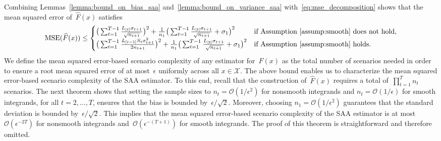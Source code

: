 \documentclass[11pt]{article}
\let\hat\widehat
\begin{document}
Combining Lemmas~\ref{lemma:bound_on_bias_saa} and~\ref{lemma:bound_on_variance_saa} with~\eqref{eq:mse_decomposition} shows that the mean squared error of~$\hat F(x)$ satisfies
\begin{align*}
\text{MSE}(\hat{F}(x)) \leq 
\begin{cases}
      \big( \sum_{t=1}^{T-1} \frac{L_{[t]}\sigma_{t+1}}{\sqrt{n_{t+1}}} \big)^2 + \frac{1}{n_1}\big(\sum_{t=1}^{T-1} \frac{L_{[t]} \sigma_{t+1}}{\sqrt{n_{t+1}}} + \sigma_1\big)^2  &\text{if Assumption~\ref{assump:smooth} does not hold},\\ 
          \big( \sum_{t=1}^{T-1} \frac{L_{[t-1]}S_t \sigma_{t+1}^2}{2n_{t+1}}  \big)^2 + \frac{1}{n_1}\big(\sum_{t=1}^{T-1} \frac{L_{[t]} \sigma_{t+1}}{\sqrt{n_{t+1}}} + \sigma_1\big)^2  &\text{if Assumption~\ref{assump:smooth} holds}.
\end{cases} 
\end{align*}
We define the mean squared error-based scenario complexity of any estimator for~$F(x)$ as the total number of scenarios needed in order to ensure a root mean squared error of at most~$\epsilon$ uniformly across all $x\in \mathcal{X}$. The above bound enables us to characterize the mean squared error-based scenario complexity of the SAA estimator. To this end, recall that the construction of~$\hat F(x)$ requires a total of~$\prod_{t=1}^{T}n_t$ scenarios. The next theorem shows that setting the sample sizes to $n_t = \mathcal{O}(1/\epsilon^2)$ for nonsmooth integrands and $n_t = \mathcal{O}(1/\epsilon)$ for smooth integrands, for all $t = 2, \ldots, T$, ensures that the bias is bounded by~$\epsilon/\sqrt{2}$. Moreover, choosing $n_1 = \mathcal{O}(1/\epsilon^2)$ guarantees that the standard deviation is bounded by~$\epsilon/\sqrt{2}$. This implies that the mean squared error-based scenario complexity of the SAA estimator is at most~$\mathcal{O}(\epsilon^{-2T})$ for nonsmooth integrands and~$\mathcal{O}(\epsilon^{-(T+1)})$ for smooth integrands. The proof of this theorem is straightforward and therefore omitted. 
\end{document}
